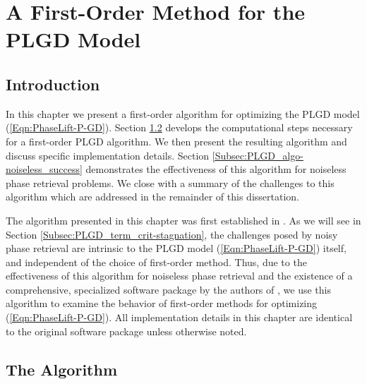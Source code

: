 \chapter{A First-Order Method for the PLGD Model}  \label{Sec:PLGD_algo}



\section{Introduction}		\label{Subsec:PLGD_algo-intro}


In this chapter we present a first-order algorithm for optimizing the PLGD model (\ref{Eqn:PhaseLift-P-GD}).  Section \ref{Subsec:PLGD_algo-algo} develops the computational steps necessary for a first-order PLGD algorithm.  We then present the resulting algorithm and discuss specific implementation details.  Section \ref{Subsec:PLGD_algo-noiseless_success} demonstrates the effectiveness of this algorithm for noiseless phase retrieval problems.  We close with a summary of the challenges to this algorithm which are addressed in the remainder of this dissertation.

The algorithm presented in this chapter was first established in \cite{DBLP:journals/siamsc/FriedlanderM16}.  
As we will see in Section \ref{Subsec:PLGD_term_crit-stagnation}, the challenges posed by noisy phase retrieval are intrinsic to the PLGD model (\ref{Eqn:PhaseLift-P-GD}) itself, and independent of the choice of first-order method.  
Thus, due to the effectiveness of this algorithm for noiseless phase retrieval and the existence of a comprehensive, specialized software package by the authors of \cite{DBLP:journals/siamsc/FriedlanderM16}, we use this algorithm to examine the behavior of first-order methods for optimizing (\ref{Eqn:PhaseLift-P-GD}).  
All implementation details in this chapter are identical to the original software package unless otherwise noted.





\section{The Algorithm}  	\label{Subsec:PLGD_algo-algo}



